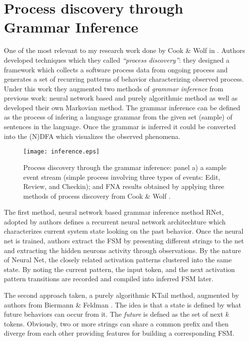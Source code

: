 \section{Process discovery through Grammar Inference} \label{grammar}
One of the most relevant to my research work done by Cook \& Wolf in \cite{citeulike:328044}. Authors developed techniques which they called \textit{``process discovery''}: they designed a framework which collects a software process data from ongoing process and generates a set of recurring patterns of behavior characterizing observed process. Under this work they augmented two methods of \textit{grammar inference} from previous work: neural network based and purely algorithmic method as well as developed their own Markovian method. The grammar inference can be defined as the process of infering a language grammar from the given set (sample) of sentences in the language. Once the grammar is inferred it could be converted into the (N)DFA which visualizes the observed phenomena. 

\begin{figure}[tbp]
   \centering
   \texttt{[image: inference.eps]}
   \caption{Process discovery through the grammar inference: panel a) a sample event stream (simple process involving three types of events: Edit, Review, and Checkin); and FNA results obtained by applying three methods of process discovery from Cook \& Wolf \cite{citeulike:328044}.}
   \label{fig:inference}
\end{figure}

The first method, neural network based grammar inference method RNet, adopted by authors defines a recurrent neural network architechture which characterizes current system state looking on the past behavior. Once the neural net is trained, authors extract the FSM by presenting different strings to the net and extracting the hidden neurons activity through observations. By the nature of Neural Net, the closely related activation patterns clustered into the same state. By noting the current pattern, the input token, and the next activation pattern transitions are recorded and compiled into inferred FSM later.

The second approach taken, a purely algorithmic KTail method, augmented by authors from Biermann \& Feldman \cite{citeulike:5120603}. The idea is that a state is defined by what future behaviors can
occur from it. The \textit{future} is defned as the set of next $k$ tokens. Obviously, two or more strings can share a common prefix and then diverge from each other providing features for building a corresponding FSM.

